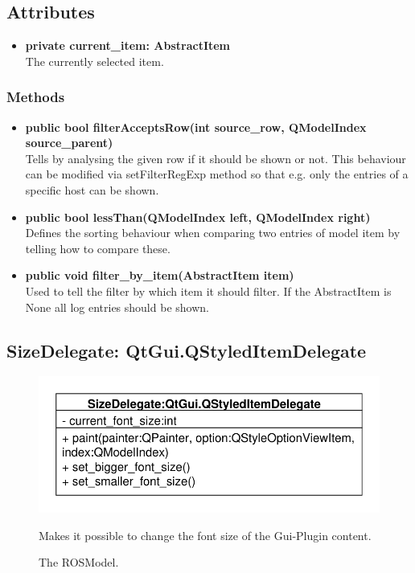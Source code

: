 \subsection{Attributes}
\begin{itemize}
  \item \textbf{private current\_item: AbstractItem}\\
  The currently selected item.
\end{itemize}
\subsubsection{Methods}
\begin{itemize}
  \item \textbf{public bool filterAcceptsRow(int source\_row, QModelIndex
  source\_parent)}\\
  Tells by analysing the given row if it should be shown or not. This behaviour can be modified via setFilterRegExp method so that e.g. only the entries of a specific host can be shown.
  \item \textbf{public bool lessThan(QModelIndex left, QModelIndex right)}\\
    Defines the sorting behaviour when comparing two entries of model item by telling how to compare these.
  \item \textbf{public void filter\_by\_item(AbstractItem item)}\\
  Used to tell the filter by which item it should filter. If the AbstractItem is None all log entries should be shown.
\end{itemize}

\subsection{SizeDelegate: QtGui.QStyledItemDelegate}
\begin{figure}[htbp]
	\begin{minipage}[t]{7cm}
		\vspace{0pt}
		\centering
		\includegraphics[scale=0.6]{./diagram_pictures/SizeDelegate.pdf}
		\caption{The ROSModel.}
	\end{minipage}
	\hfill
	\begin{minipage}[t]{7cm}
		\vspace{10pt}
		Makes it possible to change the font size of the Gui-Plugin content.
	\end{minipage}
\end{figure} 
